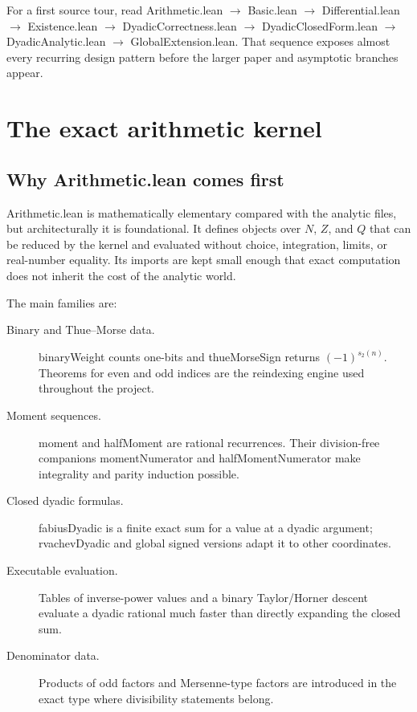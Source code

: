 \documentclass[11pt,a4paper,openany]{book}
\def\module#1{#1.lean}
\def\decl#1{#1}
\def\Q{Q}
\def\N{N}
\def\Z{Z}
\newcommand{\Q}{\ensuremath{\mathbb{Q}}}
\newcommand{\N}{\ensuremath{\mathbb{N}}}
\newcommand{\Z}{\ensuremath{\mathbb{Z}}}
\newcommand{\module}[1]{\nolinkurl{#1.lean}}
\newcommand{\decl}[1]{\texttt{\detokenize{#1}}}
\begin{document}
\begin{readingpath}
For a first source tour, read
\module{Arithmetic} $\to$ \module{Basic} $\to$
\module{Differential} $\to$ \module{Existence} $\to$
\module{DyadicCorrectness} $\to$ \module{DyadicClosedForm} $\to$
\module{DyadicAnalytic} $\to$ \module{GlobalExtension}.
That sequence exposes almost every recurring design pattern before the larger
paper and asymptotic branches appear.
\end{readingpath}

\chapter{The exact arithmetic kernel}
\label{ch:arithmetic}

\section{Why \module{Arithmetic} comes first}
\module{Arithmetic} is mathematically elementary compared with the analytic
files, but architecturally it is foundational.  It defines objects over
$\N$, $\Z$, and $\Q$ that can be reduced by the kernel and evaluated without
choice, integration, limits, or real-number equality.  Its imports are kept
small enough that exact computation does not inherit the cost of the analytic
world.

The main families are:
\begin{description}
\item[Binary and Thue--Morse data.] \decl{binaryWeight} counts one-bits and
\decl{thueMorseSign} returns $(-1)^{s_2(n)}$.  Theorems for even and odd
indices are the reindexing engine used throughout the project.
\item[Moment sequences.] \decl{moment} and \decl{halfMoment} are rational
recurrences.  Their division-free companions \decl{momentNumerator} and
\decl{halfMomentNumerator} make integrality and parity induction possible.
\item[Closed dyadic formulas.] \decl{fabiusDyadic} is a finite exact sum for a
value at a dyadic argument; \decl{rvachevDyadic} and global signed versions
adapt it to other coordinates.
\item[Executable evaluation.] Tables of inverse-power values and a binary
Taylor/Horner descent evaluate a dyadic rational much faster than directly
expanding the closed sum.
\item[Denominator data.] Products of odd factors and Mersenne-type factors are
introduced in the exact type where divisibility statements belong.
\end{description}
\end{document}
